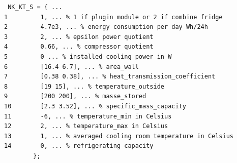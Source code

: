 \begin{lstlisting}[caption=config\_fridges.m,label={fridge}]
 % fridge configuration parameters
 NK_KT_S = { ...
1         1, ... % 1 if plugin module or 2 if combine fridge
2         4.7e3, ... % energy consumption per day Wh/24h
3         2, ... % epsilon power quotient
4         0.66, ... % compressor quotient
5         0 ... % installed cooling power in W
6         [16.4 6.7], ... % area_wall
7         [0.38 0.38], ... % heat_transmission_coefficient
8         [19 15], ... % temperature_outside
9         [200 200], ... % masse_stored
10        [2.3 3.52], ... % specific_mass_capacity
11        -6, ... % temperature_min in Celsius
12        2, ... % temperature_max in Celsius
13        1, ... % averaged cooling room temperature in Celsius
14        0, ... % refrigerating capacity
        };
\end{lstlisting}

